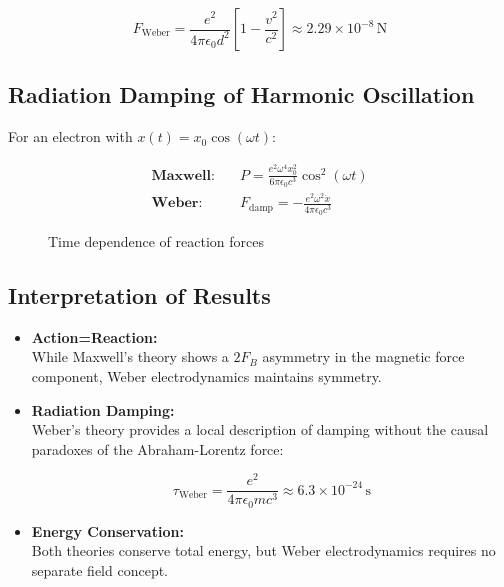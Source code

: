 \begin{equation}
    F_{\text{Weber}} = \frac{e^2}{4\pi\epsilon_0 d^2}\left[1 - \frac{v^2}{c^2}\right] \approx 2.29\times10^{-8}\,\text{N}
\end{equation}

\subsection{Radiation Damping of Harmonic Oscillation}

For an electron with $x(t) = x_0\cos(\omega t)$:

\begin{align}
    \label{eq:weber-em-damp}
    \textbf{Maxwell:}\quad & P = \frac{e^2\omega^4 x_0^2}{6\pi\epsilon_0 c^3}\cos^2(\omega t) \\
    \textbf{Weber:}\quad & F_{\text{damp}} = -\frac{e^2\omega^2\dot{x}}{4\pi\epsilon_0 c^3}
\end{align}

\begin{figure}[ht]
\centering
{}
\caption{Time dependence of reaction forces}
\end{figure}

\subsection{Interpretation of Results}

\begin{itemize}
\item \textbf{Action=Reaction:}\\While Maxwell's theory shows a $2F_B$ asymmetry in the magnetic force component, Weber electrodynamics maintains symmetry.

\item \textbf{Radiation Damping:}\\Weber's theory provides a local description of damping without the causal paradoxes of the Abraham-Lorentz force:

\begin{equation}
\tau_{\text{Weber}} = \frac{e^2}{4\pi\epsilon_0 m c^3} \approx 6.3\times10^{-24}\,\text{s}
\end{equation}

\item \textbf{Energy Conservation:}\\Both theories conserve total energy, but Weber electrodynamics requires no separate field concept.
\end{itemize}

